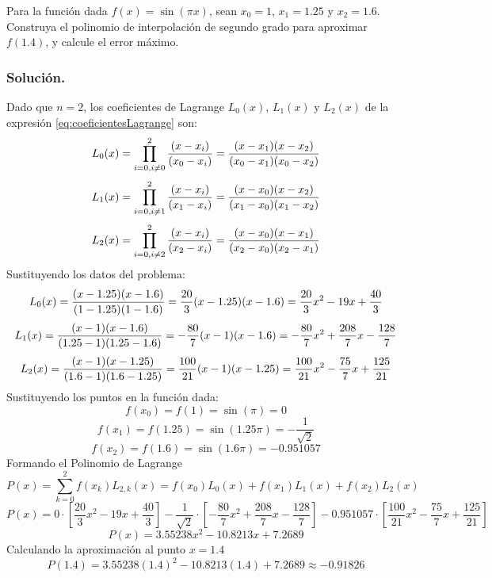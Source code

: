 \begin{example}{\rm Para la función dada $f(x) = \sin (\pi x)$, sean $x_0=1$, $x_1=1.25$ y $x_2=1.6$. Construya el polinomio de interpolación 
de segundo grado para aproximar $f(1.4)$, y calcule el error máximo.\\
	\subsubsection*{Solución.} Dado que $n=2$, los coeficientes de Lagrange $L_0(x)$, $L_1(x)$ y $L_2(x)$ de la expresión \ref{eq:coeficientesLagrange} son:
			$$L_0(x) = \prod_{i=0, i\not= 0}^{2} {(x-x_i) \over (x_0 - x_i)} = {(x-x_1)(x-x_2)\over (x_0-x_1)(x_0-x_2)}$$	
			$$L_1(x) = \prod_{i=0, i\not= 1}^{2} {(x-x_i) \over (x_1 - x_i)} = {(x-x_0)(x-x_2)\over (x_1-x_0)(x_1-x_2)}$$	
			$$L_2(x) = \prod_{i=0, i\not= 2}^{2} {(x-x_i) \over (x_2 - x_i)} = {(x-x_0)(x-x_1)\over (x_2-x_0)(x_2-x_1)}$$	
		Sustituyendo los datos del problema:
			$$L_0(x) = {(x-1.25)(x-1.6)\over (1-1.25)(1-1.6)} = \frac{20}{3}(x-1.25)(x-1.6) = \frac{20}{3}x^2 - 19x + \frac{40}{3}$$
			$$L_1(x) = {(x-1)(x-1.6)\over (1.25-1)(1.25-1.6)} = -\frac{80}{7}(x-1)(x-1.6) = -\frac{80}{7}x^2 + \frac{208}{7}x - \frac{128}{7}$$
			$$L_2(x) = {(x-1)(x-1.25)\over (1.6-1)(1.6-1.25)} = \frac{100}{21}(x-1)(x-1.25) = \frac{100}{21}x^2 - \frac{75}{7}x + \frac{125}{21}$$
		Sustituyendo los puntos en la función dada:
			$$f(x_0) = f(1) = \sin (\pi) = 0$$
			$$f(x_1) = f(1.25) = \sin (1.25\pi) = -\frac{1}{\sqrt{2}}$$
			$$f(x_2) = f(1.6) = \sin (1.6\pi) = -0.951057$$
		Formando el Polinomio de Lagrange
			$$P(x) = \sum_{k=0}^2 f(x_k)L_{2,k}(x) = f(x_0)L_0(x) + f(x_1)L_1(x) + f(x_2)L_2(x)$$
			$$P(x) = 0\cdot \left[ \frac{20}{3}x^2 - 19x + \frac{40}{3} \right] - \frac{1}{\sqrt{2}}\cdot \left[-\frac{80}{7}x^2 + \frac{208}{7}x 
			- \frac{128}{7}\right]
			-0.951057\cdot \left[ \frac{100}{21}x^2 - \frac{75}{7}x + \frac{125}{21} \right]$$
			$$P(x) = 3.55238x^2 - 10.8213x + 7.2689$$
		Calculando la aproximación al punto $x=1.4$
			$$P(1.4) = 3.55238(1.4)^2 - 10.8213(1.4) + 7.2689 \approx -0.91826$$
}\end{example}

